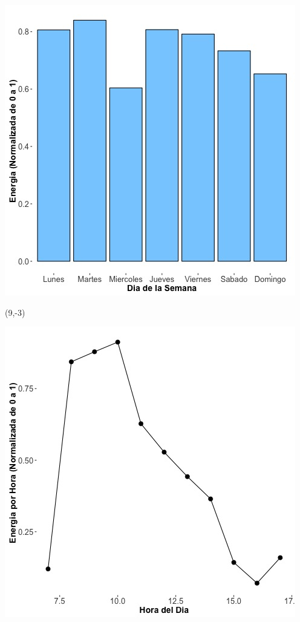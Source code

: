 \documentclass{article}\usepackage[]{graphicx}\usepackage[]{color}
\newenvironment{knitrout}{}{} %
\begin{document}
\begin{knitrout}
\color{fgcolor}
\includegraphics[scale=0.65]{figure/A19_day_of_week_plot} 
\end{knitrout}


 \begin{textblock}{1}(9,-3)
\begin{minipage}{20em}
\begingroup

\endgroup
\end{minipage}
\end{textblock}

 \vspace{2cm}

\begin{knitrout}
\color{fgcolor}
\includegraphics[scale=0.75]{figure/A19_fplot_norm_median} 
\end{knitrout}
\end{document}
